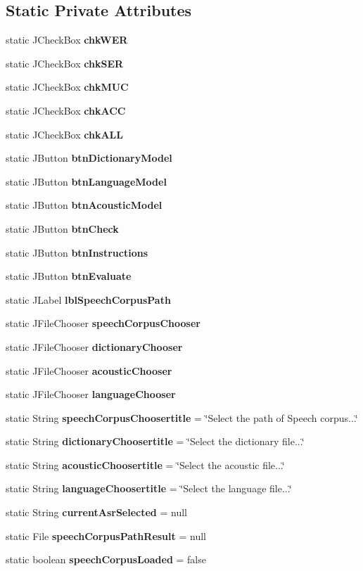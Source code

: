 \subsection*{Static Private Attributes}
\begin{DoxyCompactItemize}
\item 
static J\+Check\+Box {\bf chk\+W\+E\+R}
\item 
static J\+Check\+Box {\bf chk\+S\+E\+R}
\item 
static J\+Check\+Box {\bf chk\+M\+U\+C}
\item 
static J\+Check\+Box {\bf chk\+A\+C\+C}
\item 
static J\+Check\+Box {\bf chk\+A\+L\+L}
\item 
static J\+Button {\bf btn\+Dictionary\+Model}
\item 
static J\+Button {\bf btn\+Language\+Model}
\item 
static J\+Button {\bf btn\+Acoustic\+Model}
\item 
static J\+Button {\bf btn\+Check}
\item 
static J\+Button {\bf btn\+Instructions}
\item 
static J\+Button {\bf btn\+Evaluate}
\item 
static J\+Label {\bf lbl\+Speech\+Corpus\+Path}
\item 
static J\+File\+Chooser {\bf speech\+Corpus\+Chooser}
\item 
static J\+File\+Chooser {\bf dictionary\+Chooser}
\item 
static J\+File\+Chooser {\bf acoustic\+Chooser}
\item 
static J\+File\+Chooser {\bf language\+Chooser}
\item 
static String {\bf speech\+Corpus\+Choosertitle} = \char`\"{}Select the path of Speech corpus...\char`\"{}
\item 
static String {\bf dictionary\+Choosertitle} = \char`\"{}Select the dictionary file...\char`\"{}
\item 
static String {\bf acoustic\+Choosertitle} = \char`\"{}Select the acoustic file...\char`\"{}
\item 
static String {\bf language\+Choosertitle} = \char`\"{}Select the language file...\char`\"{}
\item 
static String {\bf current\+Asr\+Selected} = null
\item 
static File {\bf speech\+Corpus\+Path\+Result} = null
\item 
static boolean {\bf speech\+Corpus\+Loaded} = false
\item 

\end{DoxyCompactItemize}
